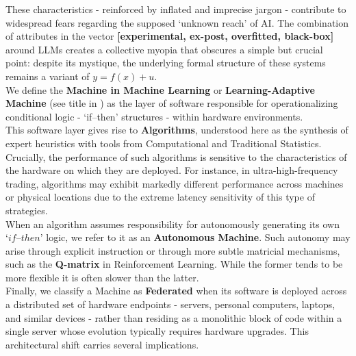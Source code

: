 \documentclass{article}
\begin{document}
These characteristics - reinforced by inflated and imprecise jargon - contribute to widespread fears regarding the supposed ‘unknown reach’ of AI. The combination of attributes in the vector \textbf{[experimental, ex-post, overfitted, black-box]} around LLMs creates a collective myopia that obscures a simple but crucial point: despite its mystique, the underlying formal structure of these systems remains a variant of \textbf{\begin{math} y = f(x) + u\end{math}}.\\

We define the \textbf{Machine in Machine Learning} or \textbf{Learning-Adaptive Machine} (see title in \cite{book}) as the layer of software responsible for operationalizing conditional logic - ‘if–then’ structures - within hardware environments.\\

This software layer gives rise to \textbf{Algorithms}, understood here as the synthesis of expert heuristics with tools from Computational and Traditional Statistics. Crucially, the performance of such algorithms is sensitive to the characteristics of the hardware on which they are deployed. For instance, in ultra-high-frequency trading, algorithms may exhibit markedly different performance across machines or physical locations due to the extreme latency sensitivity of this type of strategies.\\

When an algorithm assumes responsibility for autonomously generating its own \begin{math} ‘if–then’\end{math} logic, we refer to it as an \textbf{Autonomous Machine}. Such autonomy may arise through explicit instruction or through more subtle matricial mechanisms, such as the \textbf{Q-matrix} in Reinforcement Learning. While the former tends to be more flexible it is often slower than the latter.\\

Finally, we classify a Machine as \textbf{Federated} when its software is deployed across a distributed set of hardware endpoints - servers, personal computers, laptops, and similar devices - rather than residing as a monolithic block of code within a single server whose evolution typically requires hardware upgrades. This architectural shift carries several implications.\\
\end{document}
